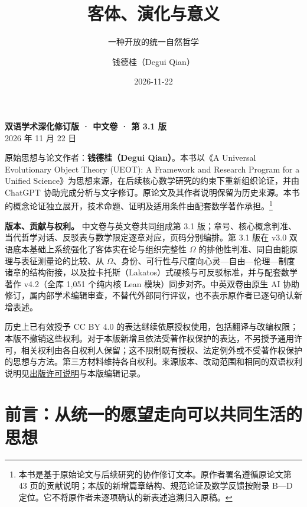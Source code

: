 \documentclass[
  11pt,
  oneside]{book}
\title{客体、演化与意义}
\subtitle{一种开放的统一自然哲学}
\author{钱德桂（Degui Qian）}
\date{2026-11-22}
\begin{document}
\frontmatter
\maketitle

{
\hypersetup{linkcolor=MidnightBlue}
\setcounter{tocdepth}{1}
\tableofcontents
}
\mainmatter
\begingroup\small\setlength{\parskip}{0.25em}

\textbf{双语学术深化修订版 · 中文卷 · 第 3.1 版}\\
2026 年 11 月 22 日

原始思想与论文作者：\textbf{钱德桂（Degui Qian）}。本书以《A Universal Evolutionary Object Theory (UEOT): A Framework and Research Program for a Unified Science》为思想来源，在后续核心数学研究的约束下重新组织论证，并由 ChatGPT 协助完成分析与文字修订。原论文及其作者说明保留为历史来源。本书的概念论证独立展开，技术命题、证明及适用条件由配套数学著作承担。\footnote{\hypertarget{ph-note-1}{}本书是基于原始论文与后续研究的协作修订文本。原作者署名遵循原论文第 43 页的贡献说明；本版的新增篇章结构、规范论证及数学反馈按附录 B---D 定位。它不将原作者未逐项确认的新表述追溯归入原稿。}

\textbf{版本、贡献与权利。} 中文卷与英文卷共同组成第 3.1 版；章号、核心概念判准、当代哲学对话、反驳表与数学限定逐章对应，页码分别编排。第 3.1 版在 v3.0 双语底本基础上系统强化了客体实在论与组织完整性 \(\Omega\) 的排他性判准、同自由能原理与表征测量论的比较、从 \(\Omega\)、身份、可行性与尺度向心灵---自由---伦理---制度诸章的结构衔接，以及拉卡托斯（Lakatos）式硬核与可反驳标准，并与配套数学著作 v4.2（全库 1,051 个纯内核 Lean 模块）同步对齐。中英双卷由原生 AI 协助修订，属内部学术编辑审查，不替代外部同行评议，也不表示原作者已逐句确认新增表述。

历史上已有效授予 CC BY 4.0 的表达继续依原授权使用，包括翻译与改编权限；本版不撤销这些权利。对于本版新增且依法受著作权保护的表达，不另授予通用许可，相关权利由各自权利人保留；这不限制既有授权、法定例外或不受著作权保护的思想与方法。第三方材料维持各自权利。来源版本、改动范围和相同的双语权利说明见\href{https://github.com/MurphyHoops/UEOT/blob/pub/philosophy-bilingual-edition/philosophy/PUBLICATION_RIGHTS.md}{出版许可说明}与本版编辑记录。

\par\endgroup

\chapter{前言：从统一的愿望走向可以共同生活的思想}\label{ph-preface}
\end{document}
